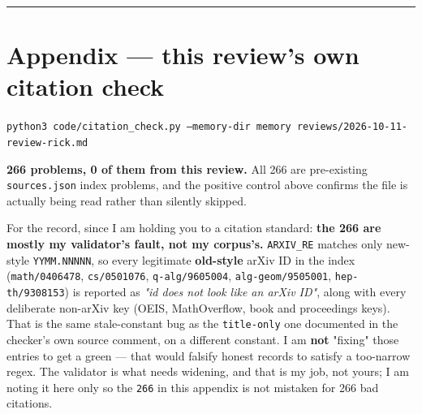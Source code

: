 \documentclass[11pt,a4paper]{article}
\begin{document}
\medskip\hrule\medskip

\section*{Appendix --- this review's own citation check}

\mbox{\texttt{python3 code/citation\_check.py --memory-dir memory reviews/2026-10-11-review-rick.md}}

\textbf{266 problems, 0 of them from this review.} All 266 are pre-existing \mbox{\texttt{sources.json}} index problems, and the positive control above confirms the file is actually being read rather than silently skipped.

For the record, since I am holding you to a citation standard: \textbf{the 266 are mostly my validator's fault, not my corpus's.} \mbox{\texttt{ARXIV\_RE}} matches only new-style \mbox{\texttt{YYMM.NNNNN}}, so every legitimate \textbf{old-style} arXiv ID in the index (\mbox{\texttt{math/0406478}}, \mbox{\texttt{cs/0501076}}, \mbox{\texttt{q-alg/9605004}}, \mbox{\texttt{alg-geom/9505001}}, \mbox{\texttt{hep-th/9308153}}) is reported as \emph{"id does not look like an arXiv ID"}, along with every deliberate non-arXiv key (OEIS, MathOverflow, book and proceedings keys). That is the same stale-constant bug as the \mbox{\texttt{title-only}} one documented in the checker's own source comment, on a different constant. I am \textbf{not} "fixing" those entries to get a green --- that would falsify honest records to satisfy a too-narrow regex. The validator is what needs widening, and that is my job, not yours; I am noting it here only so the \mbox{\texttt{266}} in this appendix is not mistaken for 266 bad citations.
\end{document}
